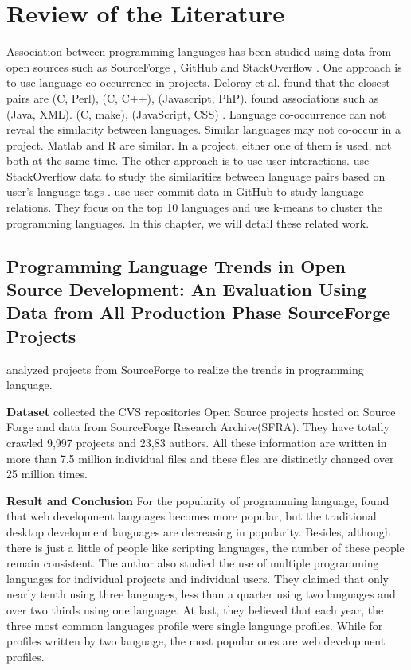 \documentclass[12pt,oneside,final]{vlsithesis}
\begin{document}
\chapter{Review of the Literature}\label{chapter:relatedWork}
Association between programming languages has been studied using data from open sources such as SourceForge \cite{delorey2007programming}, GitHub \cite{sanatinia2016github} and StackOverflow \cite{vasilescu2013stackoverflow}. One approach is to use language co-occurrence in projects. Deloray et al. found that the closest pairs are (C, Perl), (C, C++), (Javascript, PhP). \citet{karus2011study} found associations such as (Java, XML). (C, make), (JavaScript, CSS) \cite{karus2011study}. Language co-occurrence can not reveal the similarity between languages.  Similar languages may not co-occur in a project.  Matlab and R are similar. In a project, either one of them is used, not both at the same time. The other approach is to use user interactions. \citet{vasilescu2013stackoverflow} use  StackOverflow data to study the similarities between language pairs based on user's language tags \cite{vasilescu2013stackoverflow}. \citet{sanatinia2016github} use user commit data in GitHub to study language relations. They focus on the top 10 languages and use k-means to cluster the programming languages. In this chapter, we will detail these related work. 
\section{Programming Language Trends in Open Source Development:
An Evaluation Using Data from All Production Phase SourceForge Projects}
\citet{delorey2007programming} analyzed projects from SourceForge to realize the trends in programming language. 

\textbf{Dataset}
\citet{delorey2007programming} collected the CVS repositories Open Source projects hosted on Source Forge and data from SourceForge Research Archive(SFRA). They have totally crawled 9,997 projects and 23,83 authors. All these information are written in more than 7.5 million individual files and these files are distinctly changed over 25 million times. 

\textbf{Result and Conclusion}
For the popularity of programming language, \citet{delorey2007programming} found that web development languages becomes more popular, but the traditional desktop development languages are decreasing in popularity. Besides, although there is just a little of people like scripting languages, the number of these people remain consistent. The author also studied the use of multiple programming languages for individual projects and individual users. They claimed that only nearly tenth using three languages, less than a quarter using two languages and over two thirds using one language. At last, they believed that each year, the three most common languages profile were single language profiles. While for profiles written by two language, the most popular ones are web development profiles. 
\end{document}
